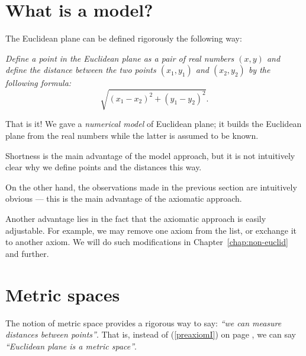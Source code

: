 \section*{What is a model?}
\label{page:model}

The Euclidean plane can be defined rigorously the following way:

{}\emph{Define a {}\emph{point} in the Euclidean plane as a pair of real numbers $(x,y)$ and define the {}\emph{distance} between the two points $(x_1,y_1)$ and $(x_2,y_2)$ by the following formula:}
\[\sqrt{(x_1-x_2)^2+(y_1-y_2)^2}.\]

That is it!
We gave a {}\emph{numerical model} of Euclidean plane;
it builds the Euclidean plane from the real numbers
while the latter is assumed to be known.

Shortness is the main advantage of the model approach,
but it is not intuitively clear why we define points and the distances this way.

On the other hand, the observations made in the previous section are intuitively obvious ---
this is the main advantage of the axiomatic approach.

Another advantage lies in the fact that the axiomatic approach is easily adjustable. 
For example, we may remove one axiom from the list,
or exchange it to another axiom. 
We will do such modifications in Chapter~\ref{chap:non-euclid} and further.

\section*{Metric spaces}

The notion of metric space provides 
a rigorous way to say: {}\emph{``we can measure distances between points''}.
That is, instead of (\ref{preaxiomI}) on page \pageref{preaxiomI},
we can say {}\emph{``Euclidean plane is a metric space''}.

